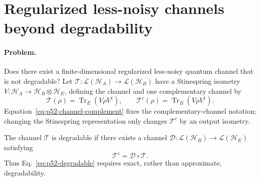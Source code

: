 \section{Regularized less-noisy channels beyond degradability}
\label{sec:op_12fc55f67580588e}

\paragraph{Problem.}
Does there exist a finite-dimensional regularized less-noisy quantum channel
that is not degradable?  Let
$\mathcal T:\mathcal L(\mathcal H_A)\to\mathcal L(\mathcal H_B)$ have a
Stinespring isometry
$V:\mathcal H_A\to\mathcal H_B\otimes\mathcal H_E$, defining the channel and
one complementary channel by
\begin{equation}
  \mathcal T(\rho)=\operatorname{Tr}_E(V\rho V^\dagger),
  \qquad
  \mathcal T^c(\rho)=\operatorname{Tr}_B(V\rho V^\dagger).
  \label{eq:p52-channel-complement}
\end{equation}
Equation~\eqref{eq:p52-channel-complement} fixes the complementary-channel
notation; changing the Stinespring representation only changes
$\mathcal T^c$ by an output isometry.

The channel $\mathcal T$ is degradable if there exists a channel
$\mathcal D:\mathcal L(\mathcal H_B)\to\mathcal L(\mathcal H_E)$ satisfying
\begin{equation}
  \mathcal T^c=\mathcal D\circ\mathcal T.
  \label{eq:p52-degradable}
\end{equation}
Thus Eq.~\eqref{eq:p52-degradable} requires exact, rather than approximate,
degradability.

